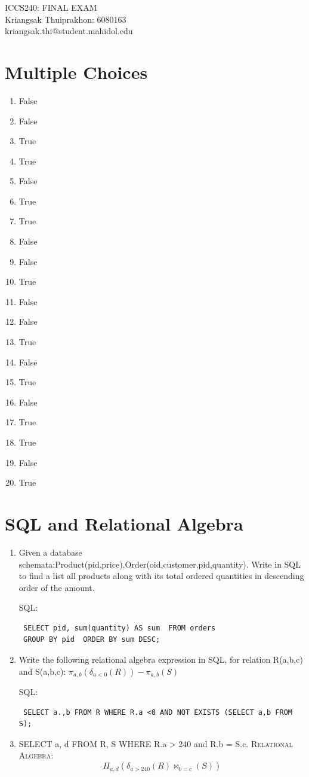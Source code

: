 \documentclass[a4paper, 11pt]{article}
\makeatletter
\newcommand{\myname}{Kriangsak Thuiprakhon: 6080163}
\newcommand{\myemail}{kriangsak.thi@student.mahidol.edu}
\newcommand{\myhwnum}{}
\makeatother
\begin{document}
\medskip                        %

\thispagestyle{plain}
\begin{center}                  %
{\Large ICCS240: FINAL EXAM \myhwnum} \\
\myname \\
\myemail \\
\end{center}
\section{Multiple Choices}
\begin{enumerate}
\item False
\item False
\item True
\item True
\item False
\item True
\item True
\item False
\item False
\item True
\item False
\item False
\item True
\item False
\item True
\item False
\item True
\item True
\item False
\item True
\end{enumerate}
\section{SQL and Relational Algebra}
\begin{enumerate}
\item Given a database schemata:Product(pid,price),Order(oid,customer,pid,quantity). Write in SQL to find a list all products along with its total ordered quantities in descending
order of the amount.

\textsc{SQL:} 
\begin{verbatim}
 SELECT pid, sum(quantity) AS sum  FROM orders 
 GROUP BY pid  ORDER BY sum DESC;
\end{verbatim}
\item Write the following relational algebra expression in SQL, for relation R(a,b,c) and S(a,b,c):  $\pi _{a,b}(\delta_{a<0}(R))- \pi_{a,b}(S)$

\textsc{SQL:} 
\begin{verbatim}
 SELECT a.,b FROM R WHERE R.a <0 AND NOT EXISTS (SELECT a,b FROM S);
\end{verbatim}
\item SELECT a, d FROM R, S WHERE R.a > 240 and R.b = S.c.
\textsc{Relational Algebra:} $$\Pi_{a,d} (\delta_{a>240}(R) \bowtie_{b=c} (S))$$
\end{enumerate}
\end{document}
